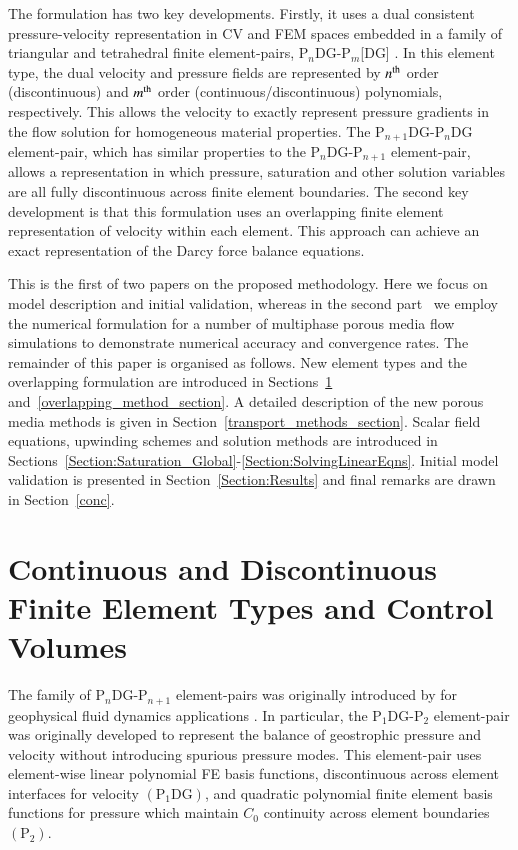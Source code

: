 \documentclass[preprint,authoryear,12pt]{elsarticle}
\newcommand{\jrp}[1]{\todo[color=blue!30, size=\small]{JRP: #1}}
\begin{document}
The formulation has two key developments. Firstly, it uses a dual consistent pressure-velocity representation in CV and FEM spaces embedded in a  family of triangular and tetrahedral finite element-pairs, P$_{n}$DG-P$_{m}$[DG] \citep[see][]{cotter_2009b}. In this element type, the dual velocity and pressure fields are represented by $n^{\rm th}$ order (discontinuous) and $m^{\rm th}$ order (continuous/discontinuous) polynomials, respectively. This allows the velocity to exactly represent pressure gradients in the flow solution for homogeneous material properties. 
The P$_{n+1}$DG-P$_{n}$DG element-pair, which has similar properties to the P$_n$DG-P$_{n+1}$ element-pair, allows a representation in which pressure, %
saturation and other solution variables are all fully discontinuous across finite element boundaries. The second key development is that this formulation uses an overlapping finite element representation of velocity within each element. This approach can achieve an exact representation of the Darcy force balance equations. 

\medskip
This is the first of two papers on the proposed methodology. Here we focus on model description and initial validation, whereas in the second part~\citep{pavlidis_2013} we employ the numerical formulation for a number of multiphase porous media flow simulations to demonstrate numerical accuracy and convergence rates. The remainder of this paper is organised as follows. New element types and the overlapping formulation are introduced in Sections~\ref{element_types_section} and~\ref{overlapping_method_section}.  A detailed description of the new porous media methods is given in Section~\ref{transport_methods_section}. Scalar field equations, upwinding schemes and solution methods are introduced in Sections~\ref{Section:Saturation_Global}-\ref{Section:SolvingLinearEqns}. Initial model validation is presented in Section~\ref{Section:Results} and final remarks are drawn in Section~\ref{conc}.


\section{Continuous and Discontinuous Finite Element Types and Control Volumes} \label{element_types_section}
The family of P$_{n}$DG-P$_{n+1}$ element-pairs was originally introduced by \citet{cotter_2009a} for geophysical fluid dynamics applications \citep[see also][]{cotter_2012}. In particular, the P$_{1}$DG-P$_{2}$ element-pair was originally developed to represent the balance of geostrophic pressure and velocity without introducing spurious pressure modes. This element-pair uses element-wise linear polynomial FE basis functions, discontinuous across element interfaces for velocity $\left(\text{P}_{1}\text{DG}\right)$, and quadratic polynomial finite element basis functions for pressure which maintain $C_{\text{0}}$ continuity across element boundaries $\left(\text{P}_{2}\right)$. %
\end{document}
